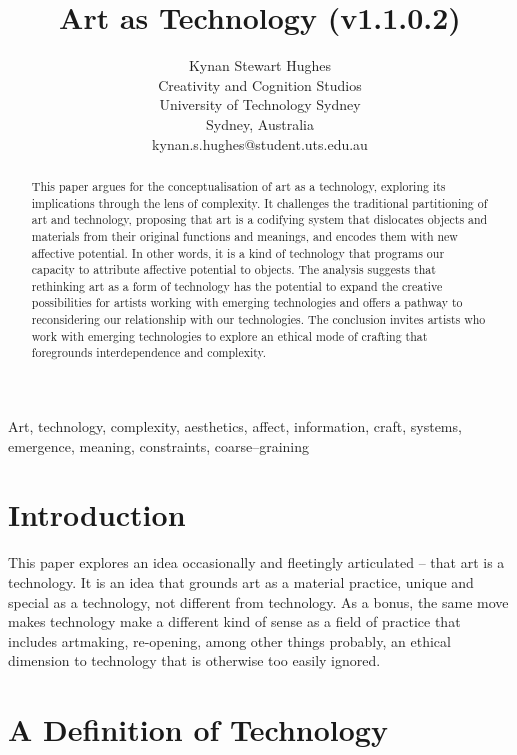 \documentclass[letter:wpaper]{article}
\title{Art as Technology (v1.1.0.2)}
\author{Kynan Stewart Hughes\\
Creativity and Cognition Studios\\
University of Technology Sydney\\
Sydney, Australia\\
kynan.s.hughes@student.uts.edu.au\\
\newline
\newline
}
\begin{document}
 
\maketitle
\begin{abstract}

    This paper argues for the conceptualisation of art as a technology, exploring its implications through the lens of complexity. It challenges the traditional partitioning of art and technology, proposing that art is a codifying system that dislocates objects and materials from their original functions and meanings, and encodes them with new affective potential. In other words, it is a kind of technology that programs our capacity to attribute affective potential to objects. The analysis suggests that rethinking art as a form of technology has the potential to expand the creative possibilities for artists working with emerging technologies and offers a pathway to reconsidering our relationship with our technologies. The conclusion invites artists who work with emerging technologies to explore an ethical mode of crafting that foregrounds interdependence and complexity.

\end{abstract}


Art, technology, complexity, aesthetics, affect, information, craft, systems, emergence, meaning, constraints, coarse–graining

\section{Introduction}

    This paper explores an idea occasionally \citep[pp.74–75]{SauvagnarguesArtmchns2016} \citep{GellThTchnlgyOfEnchntmnt1992} and fleetingly \citep[p.202]{ZepkeOSullivanDlzCntmprryArt2010} articulated – that art is a technology. It is an idea that grounds art as a material practice, unique and special as a technology, not different from technology. As a bonus, the same move makes technology make a different kind of sense as a field of practice that includes artmaking, re-opening, among other things probably, an ethical dimension to technology that is otherwise too easily ignored. 
    
\section{A Definition of Technology} 
\end{document}
